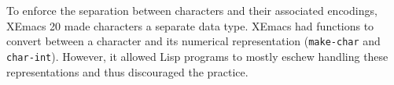 \documentclass[format=acmsmall, review=false, screen=true]{acmart}
\begin{document}
To enforce the separation between characters and their associated
encodings, XEmacs 20 made characters a separate data type.  XEmacs had
functions to convert between a character and its numerical
representation (\texttt{make-char} and \texttt{char-int}).  However,
it allowed Lisp programs to mostly eschew handling these
representations and thus discouraged the practice.









\end{document}
